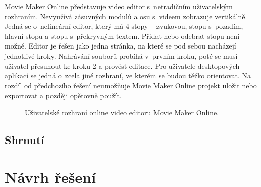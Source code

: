 Movie Maker Online představuje video editor s~netradičním uživatelským rozhraním. Nevyužívá zásuvných modulů a osu s~videem zobrazuje vertikálně. Jedná se o~nelineární editor, který má 4 stopy -- zvukovou, stopu s~pozadím, hlavní stopu a stopu s~překryvným textem. Přidat nebo odebrat stopu není možné. Editor je řešen jako jedna stránka, na které se pod sebou nacházejí jednotlivé kroky. Nahrávání souborů probíhá v~prvním kroku, poté se musí uživatel přesunout ke kroku 2 a provést editace. Pro uživatele desktopových aplikací se jedná o~zcela jiné rozhraní, ve kterém se budou těžko orientovat. Na rozdíl od předchozího řešení neumožňuje Movie Maker Online projekt uložit nebo exportovat a později opětovně použít. 
\begin{figure}[ht]
	\centering
	\caption{Uživatelské rozhraní online video editoru Movie Maker Online. }\label{img:moviemakeronline}
\end{figure}

\section{Shrnutí}

\chapter{Návrh řešení}
